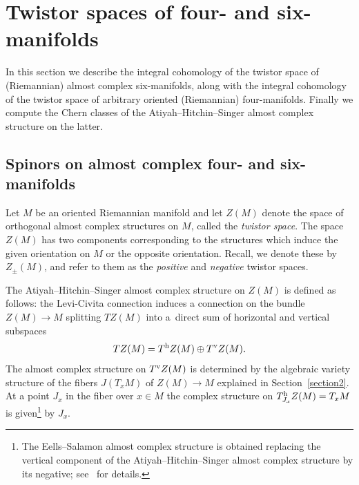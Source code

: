\section{Twistor spaces of four- and six-manifolds}\label{section3}

In this section we describe the integral cohomology of the twistor space of (Riemannian) almost complex six-manifolds, along with the integral cohomology of the twistor space of arbitrary oriented (Riemannian) four-manifolds. Finally we compute the Chern classes of the Atiyah--Hitchin--Singer almost complex structure on the latter.

\subsection{Spinors on almost complex four- and six-manifolds}

Let $M$ be an oriented Riemannian manifold and let $Z(M)$ denote the space of orthogonal almost complex structures on $M$, called the \emph{twistor space}. The space
$Z(M)$ has two components corresponding to the structures which induce the given orientation on $M$ or the opposite orientation. Recall, we
denote these by $Z_{\pm}(M)$, and refer to them as the \emph{positive} and \emph{negative} twistor spaces.

The Atiyah--Hitchin--Singer almost complex structure on $Z(M)$ is defined as follows: the Levi-Civita connection induces a connection on the bundle $Z(M) \to M$ splitting $TZ(M)$ into a~direct sum of horizontal and vertical subspaces
\[
TZ(M) =T^{\rm h} Z(M) \oplus T^{\rm v}Z(M).
\]
The almost complex structure on $T^{\rm v} Z(M)$ is determined by the algebraic variety structure of the fibers $J(T_x M)$ of $Z(M) \to M$ explained in Section~\ref{section2}. At a point $J_x$ in the fiber
over $x\in M$ the complex structure on $T^{\rm h}_{J_x} Z(M) = T_x M$ is given\footnote{The Eells--Salamon almost complex structure is obtained replacing the vertical component of the Atiyah--Hitchin--Singer almost complex structure by its negative; see~\cite[Section~3]{Sa84} for details.} by $J_x$.



